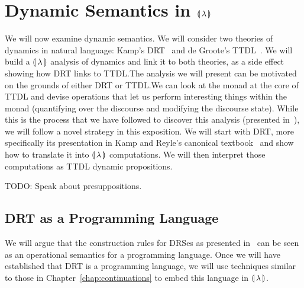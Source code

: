 \chapter{Dynamic Semantics in \texorpdfstring{$\llparenthesis \, \lambda \, \rrparenthesis$}{Our Calculus}}
\label{chap:dynamic-semantics}

We will now examine dynamic semantics. We will consider two theories of
dynamics in natural language: Kamp's DRT~\cite{kamp1993discourse} and de
Groote's TTDL~\cite{de2006towards}. We will build a $\llparenthesis \, \lambda \, \rrparenthesis$
analysis of dynamics and link it to both theories, as a side effect showing
how DRT links to TTDL.\@ The analysis we will present can be motivated on
the grounds of either DRT or TTDL.\@ We can look at the monad at the core
of TTDL and devise operations that let us perform interesting things within
the monad (quantifying over the discourse and modifying the discourse
state). While this is the process that we have followed to discover this
analysis (presented in~\cite{marsik2014algebraic}), we will follow a novel
strategy in this exposition. We will start with DRT, more specifically its
presentation in Kamp and Reyle's canonical
textbook~\cite{kamp1993discourse} and show how to translate it into
$\llparenthesis \, \lambda \, \rrparenthesis$ computations. We will then interpret those computations
as TTDL dynamic propositions.

TODO: Speak about presuppositions.

\minitoc


\section{DRT as a Programming Language}
\label{sec:drt-as-pl}

We will argue that the construction rules for DRSes as presented
in~\cite{kamp1993discourse} can be seen as an operational semantics for a
programming language. Once we will have established that DRT is a
programming language, we will use techniques similar to those in
Chapter~\ref{chap:continuations} to embed this language in
$\llparenthesis \, \lambda \, \rrparenthesis$.

\vspace{6mm}


